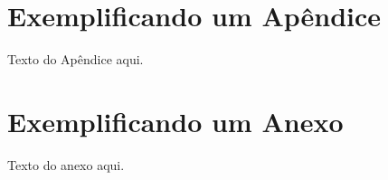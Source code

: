 \documentclass{ufscThesis} %
\begin{document}
\capa  

\folhaaprovacao
\paginadedicatoria
\paginaagradecimento
\paginaepigrafe
\paginaresumo
\paginaabstract
\listadefiguras %
\listadetabelas 
\listadeabreviaturas
\listadesimbolos
\sumario
















\apendice
\chapter{Exemplificando um Apêndice}
Texto do Apêndice aqui. 

\anexo
\chapter{Exemplificando um Anexo}
Texto do anexo aqui.
\end{document}

